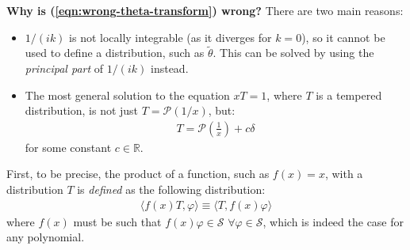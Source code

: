 \documentclass[../template.tex]{subfiles}
\begin{document}
\begin{expl}\textbf{Why is (\ref{eqn:wrong-theta-transform}) wrong?} There are two main reasons:
\begin{itemize}
    \item $1/(ik)$ is not locally integrable (as it diverges for $k=0$), so it cannot be used to define a distribution, such as $\tilde{\theta}$. This can be solved by using the \textit{principal part} of $1/(ik)$ instead. 
    \item The most general solution to the equation $xT = 1$, where $T$ is a tempered distribution, is not just $T = \mathcal{P} (1/x)$, but:
    \begin{align*}
        T = \mathcal{P}\left(\frac{1}{x} \right) + c \delta
    \end{align*}
    for some constant $c \in \mathbb{R}$.
\end{itemize}

First, to be precise, the product of a function, such as $f(x) = x$, with a distribution $T$ is \textit{defined} as the following distribution:
\begin{align} \label{eqn:dist-mult}
    \langle f(x)T, \varphi \rangle \equiv \langle T, f(x) \varphi \rangle
\end{align} 
where $f(x)$ must be such that $f(x) \varphi \in \mathcal{S}$ $\forall \varphi \in \mathcal{S}$, which is indeed the case for any polynomial. 


\end{expl}
\end{document}
